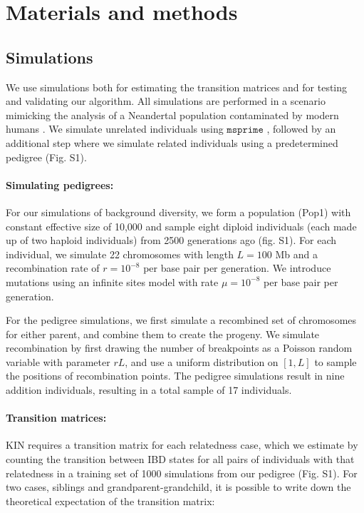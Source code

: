 \documentclass[12pt, letterpaper]{article}
\begin{document}
\section{Materials and methods}\label{method}

\subsection{Simulations}\label{simulat}
We use simulations both for estimating the transition matrices and for testing and validating our algorithm. All simulations are performed in a scenario mimicking the analysis of a Neandertal population contaminated by modern humans \cite{mafessoni_high-coverage_2020}. We simulate unrelated individuals using $\texttt{msprime}$ \cite{kelleher_efficient_2016}, followed by an additional step where we simulate related individuals using a predetermined pedigree (Fig. S1).

\paragraph{Simulating pedigrees:}

For our simulations of background diversity, we form a population (Pop1) with constant effective size of 10,000 and sample eight diploid individuals (each made up of two haploid individuals) from 2500 generations ago (fig. S1). For each individual, we simulate 22 chromosomes with length $L=100$ Mb and a recombination rate of $r=10^{-8}$ per base pair per generation. We introduce mutations using an infinite sites model with rate  $\mu= 10^{-8}$ per base pair per generation. 

For the pedigree simulations, we first simulate a recombined set of chromosomes for either parent, and combine them to create the progeny. We simulate recombination by first drawing the number of breakpoints as a  Poisson random variable with parameter $rL$, and use a uniform distribution on $[1, L]$ to sample the positions of recombination points. The pedigree simulations result in nine addition individuals, resulting in a total sample of 17 individuals.

\paragraph{Transition matrices:}
KIN requires a transition matrix for each relatedness case, which we estimate by counting the transition between IBD states for all pairs of individuals with that relatedness in a training set of 1000 simulations from our pedigree (Fig. S1). For two cases, siblings and grandparent-grandchild, it is possible to write down the theoretical expectation of the transition matrix: 
\end{document}
